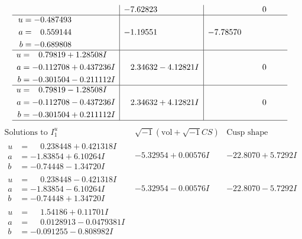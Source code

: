 \documentclass[1p]{elsarticle_modified}
\theoremstyle{definition}
\newcommand{\I}{\sqrt{-1}}
\begin{document}
$$\begin{array}{c|c|c}
 & -7.62823\phantom{ +0.000000I} & \phantom{-0.000000 } 0 \\ \hline\begin{aligned}
u &= -0.487493\phantom{ +0.000000I} \\
a &= \phantom{-}0.559144\phantom{ +0.000000I} \\
b &= -0.689808\phantom{ +0.000000I}\end{aligned}
 & -1.19551\phantom{ +0.000000I} & -7.78570\phantom{ +0.000000I} \\ \hline\begin{aligned}
u &= \phantom{-}0.79819 + 1.28508 I \\
a &= -0.112708 + 0.437236 I \\
b &= -0.301504 - 0.211112 I\end{aligned}
 & \phantom{-}2.34632 - 4.12821 I & \phantom{-0.000000 } 0 \\ \hline\begin{aligned}
u &= \phantom{-}0.79819 - 1.28508 I \\
a &= -0.112708 - 0.437236 I \\
b &= -0.301504 + 0.211112 I\end{aligned}
 & \phantom{-}2.34632 + 4.12821 I & \phantom{-0.000000 } 0\\
 \hline 
 \end{array}$$\newpage$$\begin{array}{c|c|c}  
\text{Solutions to }I^u_{1}& \I (\text{vol} + \sqrt{-1}CS) & \text{Cusp shape}\\
 \hline 
\begin{aligned}
u &= \phantom{-}0.238448 + 0.421318 I \\
a &= -1.83854 + 6.10264 I \\
b &= -0.74448 - 1.34720 I\end{aligned}
 & -5.32954 + 0.00576 I & -22.8070 + 5.7292 I \\ \hline\begin{aligned}
u &= \phantom{-}0.238448 - 0.421318 I \\
a &= -1.83854 - 6.10264 I \\
b &= -0.74448 + 1.34720 I\end{aligned}
 & -5.32954 - 0.00576 I & -22.8070 - 5.7292 I \\ \hline\begin{aligned}
u &= \phantom{-}1.54186 + 0.11701 I \\
a &= \phantom{-}0.0128913 - 0.0479381 I \\
b &= -0.091255 - 0.808982 I\end{aligned}

\end{array}$$
\end{document}
